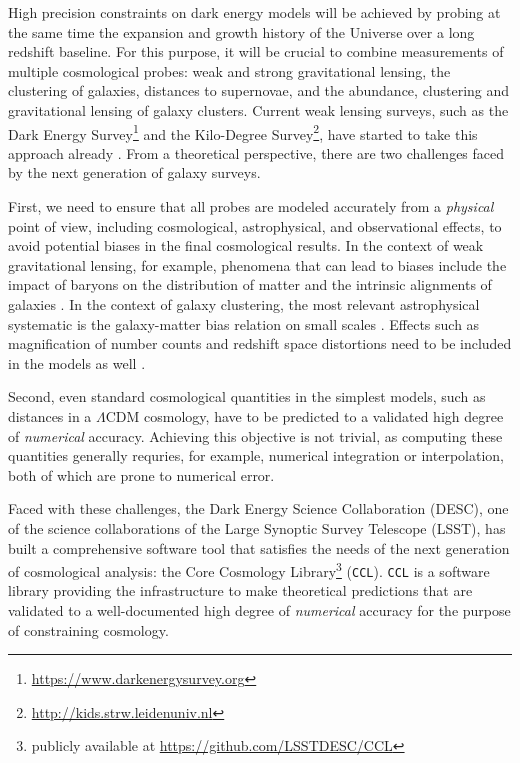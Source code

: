 \documentclass[\docopts]{\docclass}
\newcommand{\ccl}{{\tt CCL}\xspace}
\begin{document}
High precision constraints on dark energy models will be achieved by probing at the same time the expansion and growth history of the Universe over a long redshift baseline. For this purpose, it will be crucial to combine measurements of multiple cosmological probes: weak and strong gravitational lensing, the clustering of galaxies, distances to supernovae, and the abundance, clustering and gravitational lensing of galaxy clusters. Current weak lensing surveys, such as the Dark Energy Survey\footnote{\url{https://www.darkenergysurvey.org}} and the Kilo-Degree Survey\footnote{\url{http://kids.strw.leidenuniv.nl}}, have started to take this approach already \citep{Joudaki18,vanUitert18,DEScombined,krause17}. From a theoretical perspective, there are two challenges faced by the next generation of galaxy surveys. 

First, we need to ensure that all probes are modeled accurately from a {\it physical} point of view, including cosmological, astrophysical, and observational effects, to avoid potential biases in the final cosmological results. In the context of weak gravitational lensing, for example, phenomena that can lead to biases include the impact of baryons on the distribution of matter and the intrinsic alignments of galaxies \citep[e.g.][]{vanDaalen11,Semboloni11,Troxel14,Krause15,Blazek17,Chisari18}. In the context of galaxy clustering, the most relevant astrophysical systematic is the galaxy-matter bias relation on small scales \citep{2013MNRAS.436.2038Z,2016arXiv161109787D}. Effects such as magnification of number counts and redshift space distortions need to be included in the models as well \citep{Alonso15,ghosh18}. 

Second, even standard cosmological quantities in the simplest models, such as distances in a $\Lambda$CDM cosmology, have to be predicted to a validated high degree of {\it numerical} accuracy. Achieving this objective is not trivial, as computing these quantities generally requries, for example, numerical integration or interpolation, both of which are prone to numerical error.

Faced with these challenges, the Dark Energy Science Collaboration (DESC), one of the science collaborations of the Large Synoptic Survey Telescope (LSST), has built a comprehensive software tool that satisfies the needs of the next generation of cosmological analysis: the Core Cosmology Library\footnote{publicly available at \url{https://github.com/LSSTDESC/CCL}} (\ccl). \ccl is a software library providing the infrastructure to make theoretical predictions that are validated to a well-documented high degree of {\it numerical} accuracy for the purpose of constraining cosmology. 
\end{document}
